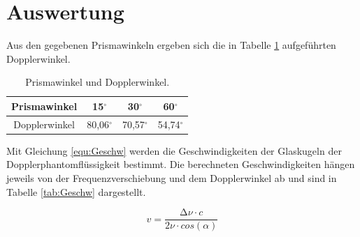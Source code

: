 \section{Auswertung}
\label{sec:Auswertung}

Aus den gegebenen Prismawinkeln ergeben sich die in Tabelle \ref{tab:1} aufgeführten Dopplerwinkel.

\begin{table}
    \centering
    \caption{Prismawinkel und Dopplerwinkel.}
    \label{tab:1}

    \begin{tabular}{c | c| c| c}
        \toprule
        Prismawinkel & 15$^{\circ}$    & 30$^{\circ}$    & 60$^{\circ}$   \\
        \midrule
        Dopplerwinkel& 80,06$^{\circ}$ & 70,57$^{\circ}$ & 54,74$^{\circ}$\\
        \bottomrule
    \end{tabular}

\end{table}

Mit Gleichung \eqref{equ:Geschw} werden die Geschwindigkeiten der Glaskugeln der Dopplerphantomflüssigkeit bestimmt.
Die berechneten Geschwindigkeiten hängen jeweils von der Frequenzverschiebung und dem Dopplerwinkel ab und 
sind in Tabelle \ref{tab:Geschw} dargestellt.

\begin{equation}
    \label{equ:Geschw}
    v = \frac{\increment \nu \cdot c}{2\nu \cdot cos(\alpha)}
\end{equation}

